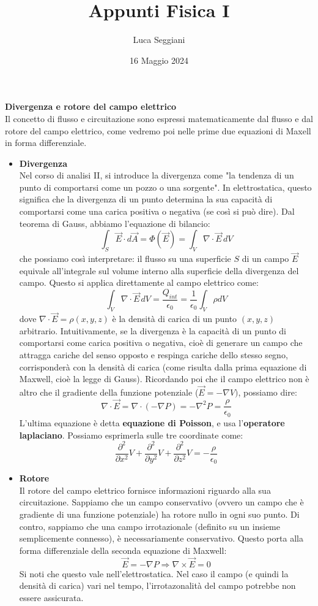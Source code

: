 \documentclass[a4paper,12pt]{article}
\title{Appunti Fisica I}
\author{Luca Seggiani}
\date{16 Maggio 2024}
\begin{document}
\maketitle
\par\smallskip
\textbf{Divergenza e rotore del campo elettrico} \\
Il concetto di flusso e circuitazione sono espressi matematicamente dal flusso e dal rotore del campo elettrico, come vedremo poi nelle prime due equazioni di Maxell in forma differenziale.
\begin{itemize}
  \item \textbf{Divergenza} \\
    Nel corso di analisi II, si introduce la divergenza come "la tendenza di un punto di comportarsi come un pozzo o una sorgente". In elettrostatica, questo significa che la divergenza di un punto determina
    la sua capacità di comportarsi come una carica positiva o negativa (se così si può dire). Dal teorema di Gauss, abbiamo l'equazione di bilancio:
    $$ \int_S \vec{E} \cdot d\vec{A} = \Phi(\vec{E}) = \int_V \nabla \cdot \vec{E} \, dV $$
    che possiamo così interpretare: il flusso su una superficie $S$ di un campo $\vec{E}$ equivale all'integrale sul volume interno alla superficie della divergenza del campo.
    Questo si applica direttamente al campo elettrico come:
    $$ \int_V \nabla \cdot \vec{E} \, dV = \frac{Q_{int}}{\epsilon_0} = \frac{1}{\epsilon_0}\int_V \rho dV $$
    dove $\nabla \cdot \vec{E} = \rho(x, y, z)$ è la densità di carica di un punto $(x, y, z)$ arbitrario. Intuitivamente, se la divergenza 
    è la capacità di un punto di comportarsi come carica positiva o negativa, cioè di generare un campo che attragga cariche del senso opposto e respinga cariche
    dello stesso segno, corrisponderà con la densità di carica (come risulta dalla prima equazione di Maxwell, cioè la legge di Gauss).
    Ricordando poi che il campo elettrico non è altro che il gradiente della funzione potenziale ($\vec{E} = -\nabla V)$, possiamo dire:
    $$ \nabla \cdot \vec{E} = \nabla \cdot(-\nabla P) = -\nabla^2 P = \frac{\rho}{\epsilon_0} $$
    L'ultima equazione è detta \textbf{equazione di Poisson}, e usa l'\textbf{operatore laplaciano}. Possiamo esprimerla sulle tre coordinate come:
    $$ \frac{\partial^2}{\partial x^2}V + \frac{\partial^2}{\partial y^2}V + \frac{\partial^2}{\partial z^2}V = -\frac{\rho}{\epsilon_0} $$
  \item \textbf{Rotore} \\
    Il rotore del campo elettrico fornisce informazioni riguardo alla sua circuitazione. Sappiamo che un campo conservativo (ovvero un campo
    che è gradiente di una funzione potenziale) ha rotore nullo in ogni suo punto. Di contro, sappiamo che una campo irrotazionale (definito su un insieme semplicemente
    connesso), è necessariamente conservativo. Questo porta alla forma differenziale della seconda equazione di Maxwell:
    $$ \vec{E} = -\nabla P \Rightarrow \nabla \times \vec{E} = 0 $$
    Si noti che  questo vale nell'elettrostatica. Nel caso il campo (e quindi la densità di carica) vari nel tempo, l'irrotazonalità
    del campo potrebbe non essere assicurata.
\end{itemize}
\end{document}
